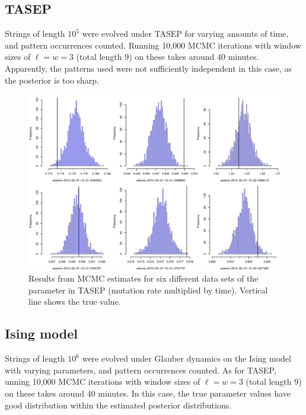 \documentclass{article}
\theoremstyle{plain}
\theoremstyle{definition}
\begin{document}
\subsection{TASEP}

Strings of length $10^5$ were evolved under TASEP for varying amounts of time,
and pattern occurrences counted.
Running 10,000 MCMC iterations with window sizes of $\ell=w=3$ (total length 9) on these takes around 40 minutes.
Apparently, the patterns used were not sufficiently independent in this case,
as the posterior is too sharp.

\begin{figure}
  \begin{center}
    \includegraphics[width=\textwidth]{tasep/all-mcmc-runs}
  \end{center}
  \caption{ Results from MCMC estimates for six different data sets of the parameter in TASEP (mutation rate multiplied by time).  
  Vertical line shows the true value.
  }
\end{figure}


\subsection{Ising model}

Strings of length $10^6$ were evolved under Glauber dynamics on the Ising model with varying parameters,
and pattern occurrences counted.
As for TASEP, unning 10,000 MCMC iterations with window sizes of $\ell=w=3$ (total length 9) on these takes around 40 minutes.
In this case, the true parameter values have good distribution within the estimated posterior distributions.
\end{document}
